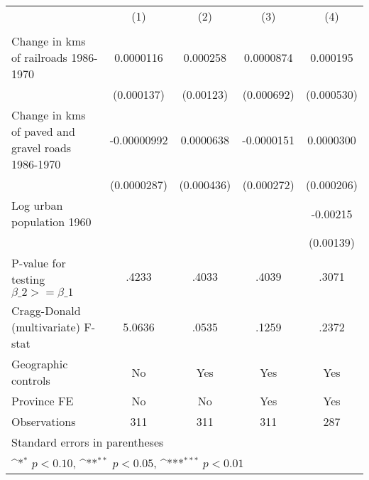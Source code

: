 {
\def\sym#1{\ifmmode^{#1}\else\(^{#1}\)\fi}
\begin{tabular}{l*{4}{c}}
\hline\hline
                &\multicolumn{1}{c}{(1)}&\multicolumn{1}{c}{(2)}&\multicolumn{1}{c}{(3)}&\multicolumn{1}{c}{(4)}\\
                &\multicolumn{1}{c}{}&\multicolumn{1}{c}{}&\multicolumn{1}{c}{}&\multicolumn{1}{c}{}\\
\hline
Change in kms of railroads 1986-1970&0.0000116         & 0.000258         &0.0000874         & 0.000195         \\
                &(0.000137)         &(0.00123)         &(0.000692)         &(0.000530)         \\
[1em]
Change in kms of paved and gravel roads 1986-1970&-0.00000992         &0.0000638         &-0.0000151         &0.0000300         \\
                &(0.0000287)         &(0.000436)         &(0.000272)         &(0.000206)         \\
[1em]
Log urban population 1960&                  &                  &                  & -0.00215         \\
                &                  &                  &                  &(0.00139)         \\
\hline
P-value for testing $\beta\_{2} >= \beta\_{1}$&    .4233         &    .4033         &    .4039         &    .3071         \\
Cragg-Donald (multivariate) F-stat&   5.0636         &    .0535         &    .1259         &    .2372         \\
Geographic controls&       No         &      Yes         &      Yes         &      Yes         \\
Province FE     &       No         &       No         &      Yes         &      Yes         \\
Observations    &      311         &      311         &      311         &      287         \\
\hline\hline
\multicolumn{5}{l}{\footnotesize Standard errors in parentheses}\\
\multicolumn{5}{l}{\footnotesize \sym{*} \(p<0.10\), \sym{**} \(p<0.05\), \sym{***} \(p<0.01\)}\\
\end{tabular}
}

